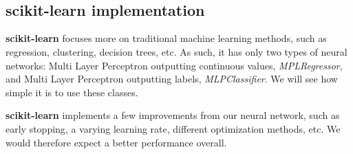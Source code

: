 \documentclass[11pt]{article}
\begin{document}
    \begin{center}
    \end{center}
    { \hspace*{\fill} \\}
    
    \begin{center}
    \end{center}
    { \hspace*{\fill} \\}
    
    \hypertarget{scikit-learn-implementation}{%
\subsection{scikit-learn
implementation}\label{scikit-learn-implementation}}

\textbf{scikit-learn} focuses more on traditional machine learning
methods, such as regression, clustering, decision trees, etc. As such,
it has only two types of neural networks: Multi Layer Perceptron
outputting continuous values, \emph{MPLRegressor}, and Multi Layer
Perceptron outputting labels, \emph{MLPClassifier}. We will see how
simple it is to use these classes.

\textbf{scikit-learn} implements a few improvements from our neural
network, such as early stopping, a varying learning rate, different
optimization methods, etc. We would therefore expect a better
performance overall.
\end{document}
